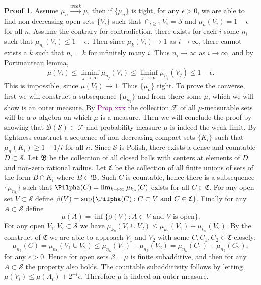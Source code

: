 \documentclass[hidelinks,11pt]{article}
\theoremstyle{definition}
\theoremstyle{dotless}
\newtheorem{prop}{Proof}[section]
\theoremstyle{remark}
\DeclareMathOperator{\1}{\mathbf{1}}
\begin{document}
\begin{prop}
Assume $\mu_n\xrightarrow{weak}\mu$, then if $\{\mu_n\}$ is tight, for any $\epsilon>0$, we are able to find non-decreasing open sets $\{V_i\}$ such that $\cap_{i\geq1}V_i=\mathcal{S}$ and $\mu_n(V_i)=1-\epsilon$ for all $n$. Assume the contrary for contradiction, there exists for each $i$ some $n_i$ such that $\mu_{n_i}(V_i)\leq1-\epsilon$. Then since $\mu_k(V_i)\to1$ as $i\to\infty$, there cannot exists a $k$ such that $n_i=k$ for infinitely many $i$. Thus $n_i\to\infty$ as $i\to\infty$, and by Portmanteau lemma,
\[\mu(V_i)\leq\liminf_{j\to\infty}\mu_{n_j}(V_i)\leq\liminf_{j\to\infty}\mu_{n_j}(V_j)\leq1-\epsilon.\]
This is impossible, since $\mu(V_i)\to1$. Thus $\{\mu_n\}$ tight.\medbreak
To prove the converse, first we will construct a subsequence $\{\mu_{n_k}\}$ and from there some $\mu$, which we will show is an outer measure. By \textcolor{purple}{Prop xxx} the collection $\mathcal{F}$ of all $\mu$-measurable sets will be a $\sigma$-algebra on which $\mu$ is a measure. Then we will conclude the proof by showing that $\mathcal{B}(\mathcal{S})\subset\mathcal{F}$ and probability measure $\mu$ is indeed the weak limit.\medbreak
By tightness construct a sequence of non-decreasing compact sets $\{K_i\}$ such that $\mu_n(K_i)\geq1-1/i$ for all $n$. Since $\mathcal{S}$ is Polish, there exists a dense and countable $D\subset\mathcal{S}$. Let $\mathfrak{B}$ be the collection of all closed balls with centers at elements of $D$ and non-zero rational radius. Let $\mathfrak{C}$ be the collection of all finite unions of sets of the form $B\cap K_i$ where $B\in\mathfrak{B}$. Such $C$ is countable, hence there is a subsequence $\{\mu_{n_k}\}$ such that $\Pilpha(C)=\lim_{k\to\infty}\mu_{k_n}(C)$ exists for all $C\in\mathfrak{C}$. For any open set $V\subset\mathcal{S}$ define $\beta(V)=\sup\{\Pilpha(C):C\subset V\textrm{ and }C\in\mathfrak{C}\}$. Finally for any $A\subset\mathcal{S}$ define
\[\mu(A)=\inf\{\beta(V):A\subset V\textrm{ and }V\textrm{ is open}\}.\]
For any open $V_1,V_2\subset\mathcal{S}$ we have $\mu_{k_n}(V_1\cup V_2)\leq\mu_{k_n}(V_1)+\mu_{k_n}(V_2)$. By the construct of $\mathfrak{C}$ we are able to approach $V_1$ and $V_2$ with some $C,C_1,C_2\in\mathfrak{C}$ closely: 
\[\mu_{n_k}(C)=\mu_{n_k}(V_1\cup V_2)\leq\mu_{n_k}(V_1)+\mu_{n_k}(V_2)=\mu_{n_k}(C_1)+\mu_{n_k}(C_2),\]
for any $\epsilon>0$. Hence for open sets $\beta=\mu$ is finite subadditive, and then for any $A\subset\mathcal{S}$ the property also holds. The countable subadditivity follows by letting $\mu(V_i)\leq\mu(A_i)+2^{-i}\epsilon$. Therefore $\mu$ is indeed an outer measure.\medbreak

\end{prop}
\end{document}
